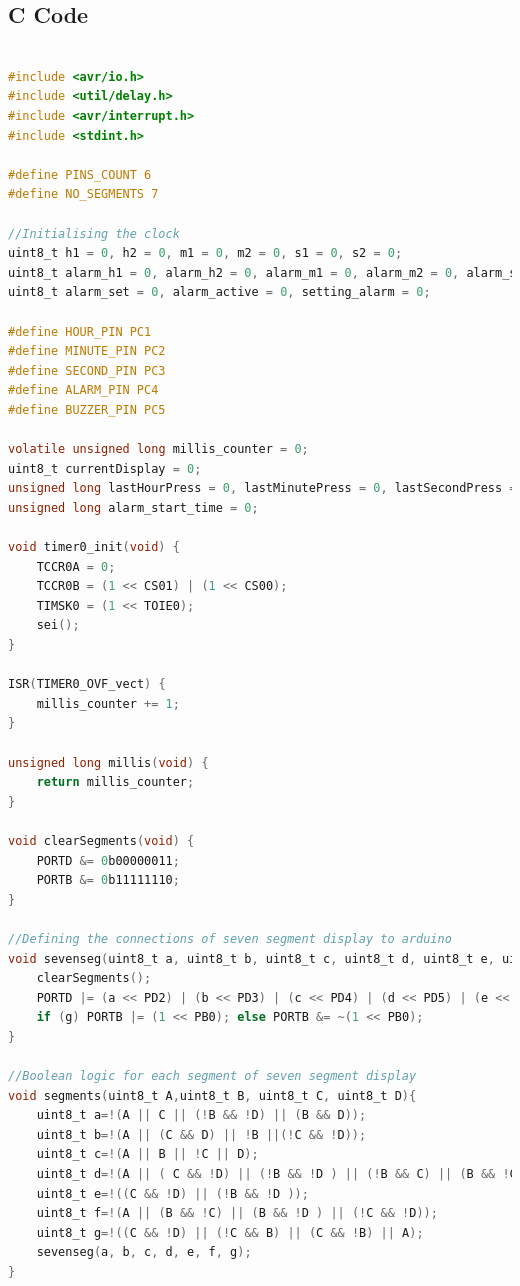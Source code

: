 \documentclass[journal]{IEEEtran}
\begin{document}
\subsection{C Code}
\begin{small}
    
\begin{lstlisting}[language=C, breaklines=true, basicstyle=\ttfamily\footnotesize]

#include <avr/io.h>
#include <util/delay.h>
#include <avr/interrupt.h>
#include <stdint.h>

#define PINS_COUNT 6
#define NO_SEGMENTS 7

//Initialising the clock
uint8_t h1 = 0, h2 = 0, m1 = 0, m2 = 0, s1 = 0, s2 = 0;
uint8_t alarm_h1 = 0, alarm_h2 = 0, alarm_m1 = 0, alarm_m2 = 0, alarm_s1 = 0, alarm_s2 = 0;
uint8_t alarm_set = 0, alarm_active = 0, setting_alarm = 0;

#define HOUR_PIN PC1
#define MINUTE_PIN PC2
#define SECOND_PIN PC3
#define ALARM_PIN PC4
#define BUZZER_PIN PC5

volatile unsigned long millis_counter = 0;
uint8_t currentDisplay = 0;
unsigned long lastHourPress = 0, lastMinutePress = 0, lastSecondPress = 0, lastAlarmPress = 0;
unsigned long alarm_start_time = 0;

void timer0_init(void) {
    TCCR0A = 0;
    TCCR0B = (1 << CS01) | (1 << CS00);
    TIMSK0 = (1 << TOIE0);
    sei();
}

ISR(TIMER0_OVF_vect) {
    millis_counter += 1;
}

unsigned long millis(void) {
    return millis_counter;
}

void clearSegments(void) {
    PORTD &= 0b00000011;
    PORTB &= 0b11111110;
}

//Defining the connections of seven segment display to arduino
void sevenseg(uint8_t a, uint8_t b, uint8_t c, uint8_t d, uint8_t e, uint8_t f, uint8_t g) {
    clearSegments();
    PORTD |= (a << PD2) | (b << PD3) | (c << PD4) | (d << PD5) | (e << PD6) | (f << PD7);
    if (g) PORTB |= (1 << PB0); else PORTB &= ~(1 << PB0);
}

//Boolean logic for each segment of seven segment display
void segments(uint8_t A,uint8_t B, uint8_t C, uint8_t D){
	uint8_t a=!(A || C || (!B && !D) || (B && D));
	uint8_t b=!(A || (C && D) || !B ||(!C && !D));
	uint8_t c=!(A || B || !C || D);
	uint8_t d=!(A || ( C && !D) || (!B && !D ) || (!B && C) || (B && !C && D));
	uint8_t e=!((C && !D) || (!B && !D ));
	uint8_t f=!(A || (B && !C) || (B && !D ) || (!C && !D));
	uint8_t g=!((C && !D) || (!C && B) || (C && !B) || A);
	sevenseg(a, b, c, d, e, f, g);
}


\end{lstlisting}
\end{small}
\end{document}
